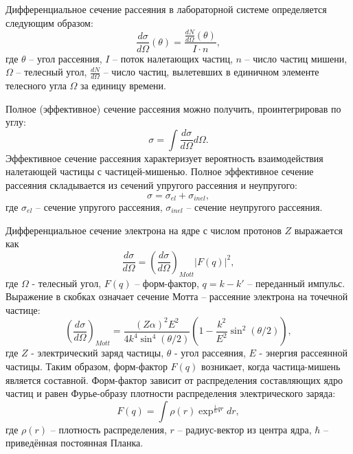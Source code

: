 \documentclass{extarticle}
\begin{document}
Дифференциальное сечение рассеяния в лабораторной системе определяется следующим образом:
\begin{equation}
    \frac{d\sigma}{d\Omega}(\theta) = \frac{\frac{dN}{d\Omega}(\theta)}{I \cdot n},
\end{equation}
где $\theta$ -- угол рассеяния, $I$ -- поток налетающих частиц, $n$ -- число частиц мишени, $\Omega$ -- телесный угол, $\frac{dN}{d\Omega}$ -- число частиц, вылетевших в единичном элементе телесного угла $\Omega$ за единицу времени.

Полное (эффективное) сечение рассеяния можно получить, проинтегрировав по углу:
\begin{equation}
    \sigma = \int \frac{d\sigma}{d\Omega}d\Omega. 
\end{equation}
Эффективное сечение рассеяния характеризует вероятность взаимодействия налетающей частицы с частицей-мишенью. Полное эффективное сечение рассеяния складывается из сечений упругого рассеяния и неупругого:
\begin{equation}
    \sigma = \sigma_{el} + \sigma_{inel},
\end{equation}
где $\sigma_{el}$ -- сечение упругого рассеяния, $\sigma_{inel}$ -- сечение неупругого рассеяния. 

Дифференциальное сечение электрона на ядре с числом протонов $Z$ выражается как 
\begin{equation}
    \frac{d\sigma}{d\Omega} = ( \frac{d\sigma}{d\Omega})_{Mott} |F(q)|^2 ,
\end{equation}
где $\Omega$ - телесный угол, $F(q)$ -- форм-фактор, $q = k-k'$ -- переданный импульс. Выражение в скобках означает сечение Мотта -- рассеяние электрона на точечной частице:
\begin{equation}
    (\frac{d\sigma}{d\Omega})_{Mott} = \frac{(Z\alpha)^2 E^2}{4k^4 \sin^4 (\theta/2)} (1- \frac{k^2}{E^2} \sin^2(\theta/2)),
\end{equation}
где $Z$ - электрический заряд частицы, $\theta$ - угол рассеяния, $E$ - энергия рассеянной частицы. Таким образом, форм-фактор $F(q)$ возникает, когда частица-мишень является составной. Форм-фактор зависит от распределения составляющих ядро частиц и равен Фурье-образу плотности распределения электрического заряда:
\begin{equation}
    F(q) = \int \rho(r) \exp^{\frac{i}{\hbar}qr}dr,
\end{equation}
где $\rho(r)$ -- плотность распределения, $r$ -- радиус-вектор из центра ядра, $\hbar$ -- приведённая постоянная Планка.
\end{document}
